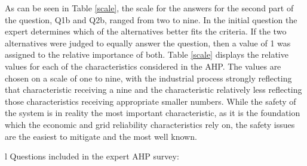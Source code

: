 As can be seen in Table \ref{scale}, the scale for the answers for the second part of the question, Q1b and Q2b, ranged from two to  nine.  In the initial question the expert determines which of the alternatives better fits the criteria.  If the two alternatives were judged to equally answer the question, then a value of 1 was assigned to the relative importance of both. Table \ref{scale} displays the relative values for each of the characteristics considered in the AHP. The values are chosen on a scale of one to nine, with the industrial process strongly reflecting that characteristic receiving a nine and the characteristic relatively less reflecting those characteristics receiving appropriate smaller numbers. While the safety of the system is in reality the most important characteristic, as it is the foundation which the economic and grid reliability characteristics rely on, the safety issues are the easiest to mitigate and the most well known.

\begin{table}[h!]
\centering
\caption{Example of questions given in the Expert AHP survey}
\label{AHPQuestions}
\begin{tabular}{l}
Questions included in the expert AHP survey:                                                                                   \\ \hline
{} \\ \hline
\end{tabular}
\label{questions}
\end{table}

